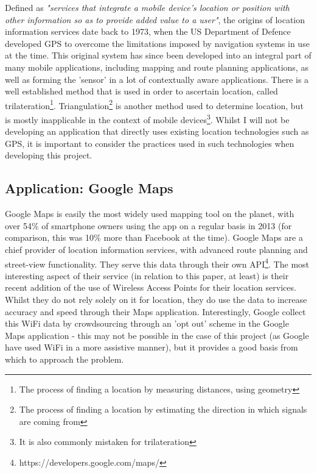 \documentclass[11pt]{informatics-report}
\begin{document}
Defined as \textit{"services that integrate a mobile device's location or position with other information so as to provide added value to a user"}\cite{schiller2004location}, the origins of location information services date back to 1973, when the US Department of Defence developed GPS to overcome the limitations imposed by navigation systems in use at the time\cite{national1995global}. This original system has since been developed into an integral part of many mobile applications, including mapping and route planning applications, as well as forming the 'sensor' in a lot of contextually aware applications. There is a well established method that is used in order to ascertain location, called trilateration\footnote{The process of finding a location by measuring distances, using geometry}. Triangulation\footnote{The process of finding a location by estimating the direction in which signals are coming from} is another method used to determine location, but is mostly inapplicable in the context of mobile devices\footnote{It is also commonly mistaken for trilateration}. Whilst I will not be developing an application that directly uses existing location technologies such as GPS, it is important to consider the practices used in such technologies when developing this project.

\subsection{Application: Google Maps}

Google Maps is easily the most widely used mapping tool on the planet, with over 54\% of smartphone owners using the app on a regular basis in 2013 (for comparison, this was 10\% more than Facebook at the time)\cite{googlemaps}. Google Maps are a chief provider of location information services, with advanced route planning and street-view functionality. They serve this data through their own API\footnote{https://developers.google.com/maps/}. The most interesting aspect of their service (in relation to this paper, at least) is their recent addition of the use of Wireless Access Points for their location services. Whilst they do not rely solely on it for location, they do use the data to increase accuracy and speed through their Maps application\cite{googleWiFi}. Interestingly, Google collect this WiFi data by crowdsourcing through an 'opt out' scheme in the Google Maps application\cite{googleWiFi2} - this may not be possible in the case of this project (as Google have used WiFi in a more assistive manner), but it provides a good basis from which to approach the problem.
\end{document}
